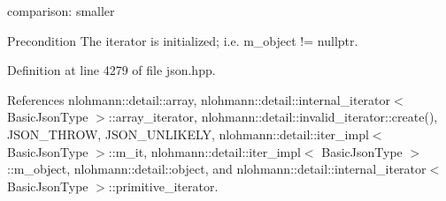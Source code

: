 comparison\+: smaller 

\begin{DoxyPrecond}{Precondition}
The iterator is initialized; i.\+e. {\ttfamily m\+\_\+object != nullptr}. 
\end{DoxyPrecond}


Definition at line 4279 of file json.\+hpp.



References nlohmann\+::detail\+::array, nlohmann\+::detail\+::internal\+\_\+iterator$<$ Basic\+Json\+Type $>$\+::array\+\_\+iterator, nlohmann\+::detail\+::invalid\+\_\+iterator\+::create(), J\+S\+O\+N\+\_\+\+T\+H\+R\+OW, J\+S\+O\+N\+\_\+\+U\+N\+L\+I\+K\+E\+LY, nlohmann\+::detail\+::iter\+\_\+impl$<$ Basic\+Json\+Type $>$\+::m\+\_\+it, nlohmann\+::detail\+::iter\+\_\+impl$<$ Basic\+Json\+Type $>$\+::m\+\_\+object, nlohmann\+::detail\+::object, and nlohmann\+::detail\+::internal\+\_\+iterator$<$ Basic\+Json\+Type $>$\+::primitive\+\_\+iterator.


